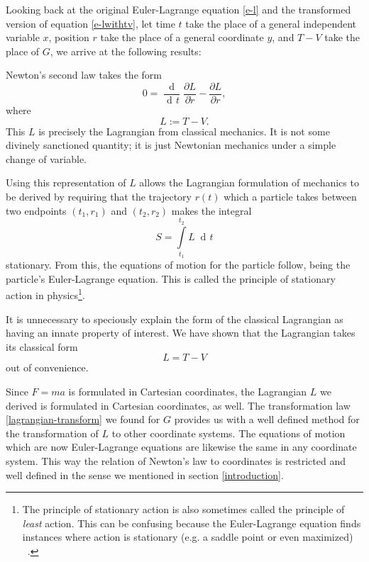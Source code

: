 \documentclass[prb,preprint]{revtex4-1}
\DeclareMathOperator{\dd}{d\!}
\DeclareMathOperator{\ddd}{\mathrm{d}}
\begin{document}
Looking back at the original Euler-Lagrange equation \eqref{e-l} and the transformed version of equation \eqref{e-lwithtv}, let time $t$ take the place of a general independent variable $x$, position $r$ take the place of a general coordinate $y$, and $T-V$ take the place of $G$, we arrive at the following results:

Newton's second law takes the form
\begin{equation}
0 = \frac{\ddd}{\dd t} \frac{\partial L}{\partial \dot{r}} - \frac{\partial L}{\partial r},
\end{equation}
where
\begin{equation}
 L := T-V.
\end{equation}
This $L$ is precisely the Lagrangian from classical mechanics. It is not some divinely sanctioned quantity; it is just Newtonian mechanics under a simple change of variable.

Using this representation of $L$ allows the Lagrangian formulation of mechanics to be derived by requiring that the trajectory $r(t)$ which a particle takes between two endpoints $(t_1,r_1)$ and $(t_2,r_2)$ makes the integral
\begin{equation}\label{eqref:action}
S=\int\limits_{t_1}^{t_2} L \; \dd t
\end{equation}
stationary. From this, the equations of motion for the particle follow, being the particle's Euler-Lagrange equation. This is called the principle of stationary action in physics\footnote{The principle of stationary action is also sometimes called the principle of \emph{least} action. This can be confusing because the Euler-Lagrange equation finds instances where action is stationary (e.g. a saddle point or even maximized)  ~\cite{gray2007action}.}.

It is unnecessary to speciously explain the form of the classical Lagrangian as having an innate property of interest. We have shown that the Lagrangian takes its classical form
\begin{equation}
  L = T-V
\end{equation}
out of convenience.

Since $F=ma$ is formulated in Cartesian coordinates, the Lagrangian $L$ we derived is formulated in Cartesian coordinates, as well. The transformation law \eqref{lagrangian-transform} we found for $G$ provides us with a well defined method for the transformation of $L$ to other coordinate systems. The equations of motion which are now Euler-Lagrange equations are likewise the same in any coordinate system.  This way the relation of Newton's law to coordinates is restricted and well defined in the sense we mentioned in section \ref{introduction}. %
\end{document}
